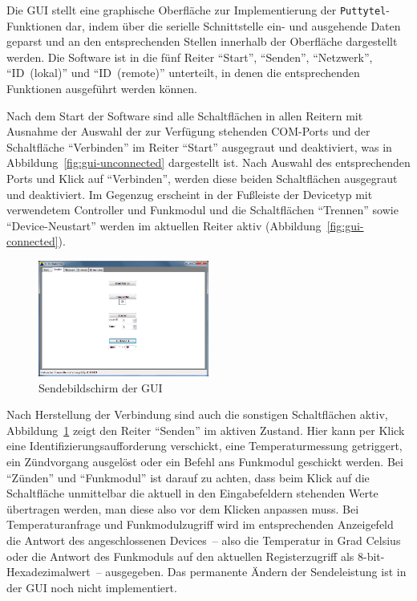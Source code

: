 \documentclass[paper=a4, parskip, numbers=noenddot, toc=listof, headsepline]{scrbook}
\begin{document}
		  Die GUI stellt eine graphische Oberfläche zur Implementierung der \texttt{Puttytel}-Funktionen dar, indem über die serielle Schnittstelle ein- und ausgehende Daten geparst und an den entsprechenden Stellen innerhalb der Oberfläche dargestellt werden. Die Software ist in die fünf Reiter \enquote{Start}, \enquote{Senden}, \enquote{Netzwerk}, \enquote{ID~(lokal)} und \enquote{ID~(remote)} unterteilt, in denen die entsprechenden Funktionen ausgeführt werden können.

		  Nach dem Start der Software sind alle Schaltflächen in allen Reitern mit Ausnahme der Auswahl der zur Verfügung stehenden COM-Ports und der Schaltfläche \enquote{Verbinden} im Reiter \enquote{Start} ausgegraut und deaktiviert, was in Abbildung~\ref{fig:gui-unconnected} dargestellt ist. Nach Auswahl des entsprechenden Ports und Klick auf \enquote{Verbinden}, werden diese beiden Schaltflächen ausgegraut und deaktiviert. Im Gegenzug erscheint in der Fußleiste der Devicetyp mit verwendetem Controller und Funkmodul und die Schaltflächen \enquote{Trennen} sowie \enquote{Device-Neustart} werden im aktuellen Reiter aktiv (Abbildung~\ref{fig:gui-connected}).%
		  \begin{figure}[!b]
			  \centering
			  \includegraphics[width=0.5\textwidth]{bilder/gui-senden}
			  \caption{Sendebildschirm der GUI}
			  \label{fig:gui-senden}
		  \end{figure}

		  Nach Herstellung der Verbindung sind auch die sonstigen Schaltflächen aktiv, Abbildung~\ref{fig:gui-senden} zeigt den Reiter \enquote{Senden} im aktiven Zustand. Hier kann per Klick eine Identifizierungsaufforderung verschickt, eine Temperaturmessung getriggert, ein Zündvorgang ausgelöst oder ein Befehl ans Funkmodul geschickt werden. Bei \enquote{Zünden} und \enquote{Funkmodul} ist darauf zu achten, dass beim Klick auf die Schaltfläche unmittelbar die aktuell in den Eingabefeldern stehenden Werte übertragen werden, man diese also vor dem Klicken anpassen muss. Bei Temperaturanfrage und Funkmodulzugriff wird im entsprechenden Anzeigefeld die Antwort des angeschlossenen Devices~-- also die Temperatur in Grad Celsius oder die Antwort des Funkmoduls auf den aktuellen Registerzugriff als 8-bit-Hexadezimalwert~-- ausgegeben. Das permanente Ändern der Sendeleistung ist in der GUI noch nicht implementiert.
\end{document}
